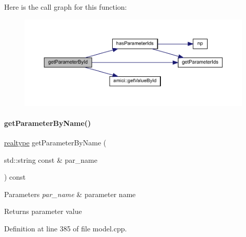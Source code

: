 Here is the call graph for this function\+:
\nopagebreak
\begin{figure}[H]
\begin{center}
\leavevmode
\includegraphics[width=350pt]{classamici_1_1_model_a4436bd89ae2cb032cbf13db478d99e15_cgraph}
\end{center}
\end{figure}
\mbox{\label{classamici_1_1_model_a19b349ca9793d45fda7ef8ea7422747a}} 
\paragraph{\texorpdfstring{get\+Parameter\+By\+Name()}{getParameterByName()}}
{\footnotesize\ttfamily \mbox{\hyperlink{namespaceamici_a1bdce28051d6a53868f7ccbf5f2c14a3}{realtype}} get\+Parameter\+By\+Name (\begin{DoxyParamCaption}\item[{std\+::string const \&}]{par\+\_\+name }\end{DoxyParamCaption}) const}


\begin{DoxyParams}{Parameters}
{\em par\+\_\+name} & parameter name \\
\hline
\end{DoxyParams}
\begin{DoxyReturn}{Returns}
parameter value 
\end{DoxyReturn}


Definition at line 385 of file model.\+cpp.

